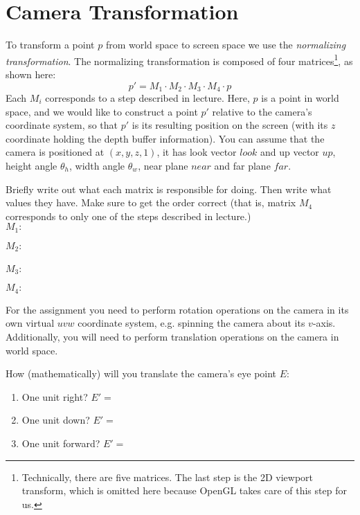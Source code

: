\documentclass[10pt,twocolumn]{article}
\begin{document}
\begin{framed}
\vspace{10em}
\end{framed}


\section{Camera Transformation}
To transform a point $p$ from world space to screen space we use the \emph{normalizing transformation}. The normalizing transformation is composed of four matrices\footnote{Technically, there are five matrices. The last step is the 2D viewport transform, which is omitted here because OpenGL takes care of this step for us.}, as shown here:
\[p' = M_1 \cdot M_2 \cdot M_3 \cdot M_4 \cdot p\]
Each $M_i$ corresponds to a step described in lecture. Here, $p$ is a point in world space, and we would like to construct a point $p'$ relative to the camera's coordinate system, so that $p'$ is its resulting position on the screen (with its $z$ coordinate holding the depth buffer information). You can assume that the camera is positioned at $(x,y,z,1)$, it has look vector $look$ and up vector $up$, height angle $\theta_h$, width angle $\theta_w$, near plane $near$ and far plane $far$.
\begin{framed}
\noindent {\bf [1/2 pt. each]} Briefly write out what each matrix is responsible for doing. Then write what values they have. Make sure to get the order correct (that is, matrix $M_4$ corresponds to only one of the steps described in lecture.)\\

$M_1:$
\vspace{3em}

$M_2:$\\\\


$M_3:$
\vspace{3em}

$M_4:$
\vspace{3em}

\end{framed}
\noindent For the assignment you need to perform rotation operations on the camera in its own virtual $uvw$ coordinate system, e.g. spinning the camera about its $v$-axis. Additionally, you will need to perform translation operations on the camera in world space.
\begin{framed}
\noindent {\bf [1/2 pt. each]} How (mathematically) will you translate the camera's eye point $E$:
\begin{enumerate}
\item One unit right? $E' = $\\
\item One unit down? $E' = $\\
\item One unit forward? $E' = $\\
\end{enumerate}
\end{framed}
\end{document}
